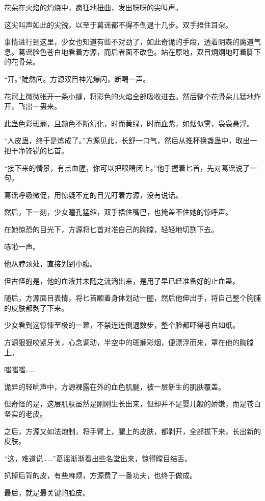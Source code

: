 \begin{this_body}
花朵在火焰的灼烧中，疯狂地扭曲，发出呀呀的尖叫声。

这尖叫声如此的尖锐，以至于葛谣都不得不倒退十几步。双手捂住耳朵。

事情进行到这里，少女也知道有些不对劲了，如此奇诡的手段，透着阴森的魔道气息。葛谣脸色苍白地看着方源，而后者面不改色。站在原地，双目炯炯地盯着脚下的花骨朵。

“开。”陡然间。方源双目神光爆闪，断喝一声。

花冠上微微张开一条小缝，将彩色的火焰全部吸收进去。然后整个花骨朵儿猛地炸开，飞出一蛊来。

此蛊色彩斑斓，且颜色不断幻化，时而黄绿，时而血紫，如烟似雾，袅袅悬浮。

“人皮蛊，终于是炼成了。”方源见此，长舒一口气，然后从推杯换盏蛊中，取出一把干净锋锐的匕首。

“接下来的情景，有点血腥，你可以把眼睛闭上。”他手握着匕首，先对葛谣说了一句。

葛谣呼吸微促，用惊疑不定的目光盯着方源，没有说话。

然后，下一刻，少女瞳孔猛缩，双手捂住嘴巴，也掩盖不住她的惊呼声。

在她惊恐的目光下，方源将匕首对准自己的胸膛，轻轻地切割下去。

哧啦一声。

他从脖颈处，直接划到小腹。

但古怪的是，他的血液并未随之流淌出来，是用了早已经准备好的止血蛊。

随后，方源面目表情，将匕首顺着身体划动一圈，然后他伸出手，将自己整个胸脯的皮肤都剥了下来。

少女看到这惊悚至极的一幕，不禁连连倒退数步，整个脸都吓得苍白如纸。

方源狠狠咬紧牙关，心念调动，半空中的斑斓彩烟，便漂浮而来，罩在他的胸膛上。

嗤嗤嗤……

诡异的轻响声中，方源裸露在外的血色肌腱，被一层新生的肌肤覆盖。

但奇怪的是，这层肌肤虽然是刚刚生长出来，但却并不是婴儿般的娇嫩，而是苍白坚实的老皮。

之后，方源又如法炮制，将手臂上，腿上的皮肤，都剥开，全部拔下来，长出新的皮肤。

“这，难道说……”葛谣渐渐看出些名堂出来，惊得瞠目结舌。

扒掉后背的皮，有些麻烦，方源费了一番功夫，也终于做成。

最后，就是最关键的脸皮。


\end{this_body}
